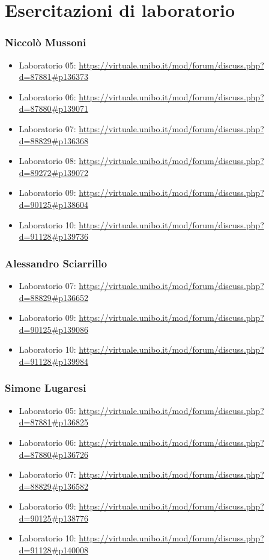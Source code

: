 \documentclass[a4paper,12pt]{report}
\begin{document}
\chapter{Esercitazioni di laboratorio}
\subsection*{Niccolò Mussoni}
\begin{itemize}
	\item Laboratorio 05: \url{https://virtuale.unibo.it/mod/forum/discuss.php?d=87881#p136373}
	\item Laboratorio 06: \url{https://virtuale.unibo.it/mod/forum/discuss.php?d=87880#p139071}
	\item Laboratorio 07: \url{https://virtuale.unibo.it/mod/forum/discuss.php?d=88829#p136368}
	\item Laboratorio 08: \url{https://virtuale.unibo.it/mod/forum/discuss.php?d=89272#p139072}
	\item Laboratorio 09: \url{https://virtuale.unibo.it/mod/forum/discuss.php?d=90125#p138604}
	\item Laboratorio 10: \url{https://virtuale.unibo.it/mod/forum/discuss.php?d=91128#p139736}
\end{itemize}

\subsection*{Alessandro Sciarrillo}
\begin{itemize}
	\item Laboratorio 07: \url{https://virtuale.unibo.it/mod/forum/discuss.php?d=88829#p136652}
	\item Laboratorio 09: \url{https://virtuale.unibo.it/mod/forum/discuss.php?d=90125#p139086}
	\item Laboratorio 10: \url{https://virtuale.unibo.it/mod/forum/discuss.php?d=91128#p139984}
\end{itemize}

\subsection*{Simone Lugaresi}
\begin{itemize}
	\item Laboratorio 05: \url{https://virtuale.unibo.it/mod/forum/discuss.php?d=87881#p136825}
	\item Laboratorio 06: \url{https://virtuale.unibo.it/mod/forum/discuss.php?d=87880#p136726}
	\item Laboratorio 07: \url{https://virtuale.unibo.it/mod/forum/discuss.php?d=88829#p136582}
	\item Laboratorio 09: \url{https://virtuale.unibo.it/mod/forum/discuss.php?d=90125#p138776}
	\item Laboratorio 10: \url{https://virtuale.unibo.it/mod/forum/discuss.php?d=91128#p140008}
\end{itemize}
\end{document}
